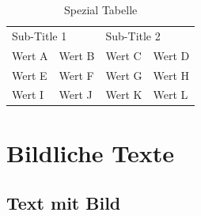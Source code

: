 \documentclass{scrreprt}
\begin{document}
\begin{table}[h!]

\centering
\caption{Spezial Tabelle}
\label{tab:speziatabelle}

	
\begin{tabular}{|l|l|l|l|}

\multicolumn{2}{|l|}{Sub-Title 1} & \multicolumn{2}{l|}{Sub-Title 2} \\ 
Wert A          & Wert B          & Wert C          & Wert D         \\ 
Wert E          & Wert F          & Wert G          & Wert H         \\ 
Wert I          & Wert J          & Wert K          & Wert L         \\ 
\end{tabular}
\end{table}
\newpage

\chapter{Bildliche Texte}
\label{cha:bildlichetexte}
\section{Text mit Bild \cite{ref2}}
\label{se:textmitbild}
\end{document}
